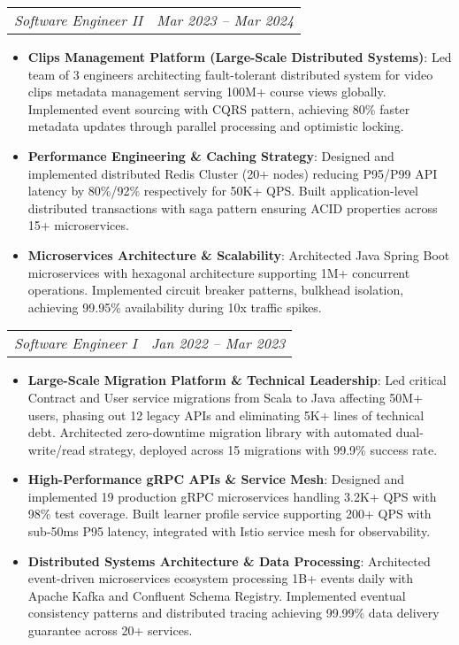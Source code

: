 \documentclass[letterpaper,11pt]{article}
\makeatletter
\newcommand{\resumeItem}[2]{
  \item\small{
    \textbf{#1}{: #2 \vspace{-2pt}}
  }
}
\newcommand{\resumeSubSubheading}[2]{
    \begin{tabular*}{0.97\textwidth}{l@{\extracolsep{\fill}}r}
      \textit{\small#1} & \textit{\small #2} \\
    \end{tabular*}\vspace{-4pt}
}
\newcommand{\resumeItemListStart}{\begin{itemize}[itemsep=2pt, parsep=0pt]}
\newcommand{\resumeItemListEnd}{\end{itemize}\vspace{-4pt}}
\makeatother
\begin{document}
  \resumeSubSubheading
    {Software Engineer II}{Mar 2023 -- Mar 2024}
    \resumeItemListStart
      \resumeItem{Clips Management Platform (Large-Scale Distributed Systems)}
        {Led team of 3 engineers architecting fault-tolerant distributed system for video clips metadata management serving 100M+ course views globally. Implemented event sourcing with CQRS pattern, achieving 80\% faster metadata updates through parallel processing and optimistic locking.}
      \resumeItem{Performance Engineering \& Caching Strategy}
        {Designed and implemented distributed Redis Cluster (20+ nodes) reducing P95/P99 API latency by 80\%/92\% respectively for 50K+ QPS. Built application-level distributed transactions with saga pattern ensuring ACID properties across 15+ microservices.}
      \resumeItem{Microservices Architecture \& Scalability}
        {Architected Java Spring Boot microservices with hexagonal architecture supporting 1M+ concurrent operations. Implemented circuit breaker patterns, bulkhead isolation, achieving 99.95\% availability during 10x traffic spikes.}
    \resumeItemListEnd

  \resumeSubSubheading
    {Software Engineer I}{Jan 2022 -- Mar 2023}
    \resumeItemListStart
      \resumeItem{Large-Scale Migration Platform \& Technical Leadership}
        {Led critical Contract and User service migrations from Scala to Java affecting 50M+ users, phasing out 12 legacy APIs and eliminating 5K+ lines of technical debt. Architected zero-downtime migration library with automated dual-write/read strategy, deployed across 15 migrations with 99.9\% success rate.}
      \resumeItem{High-Performance gRPC APIs \& Service Mesh}
        {Designed and implemented 19 production gRPC microservices handling 3.2K+ QPS with 98\% test coverage. Built learner profile service supporting 200+ QPS with sub-50ms P95 latency, integrated with Istio service mesh for observability.}
      \resumeItem{Distributed Systems Architecture \& Data Processing}
        {Architected event-driven microservices ecosystem processing 1B+ events daily with Apache Kafka and Confluent Schema Registry. Implemented eventual consistency patterns and distributed tracing achieving 99.99\% data delivery guarantee across 20+ services.}
    \resumeItemListEnd



\end{document}
